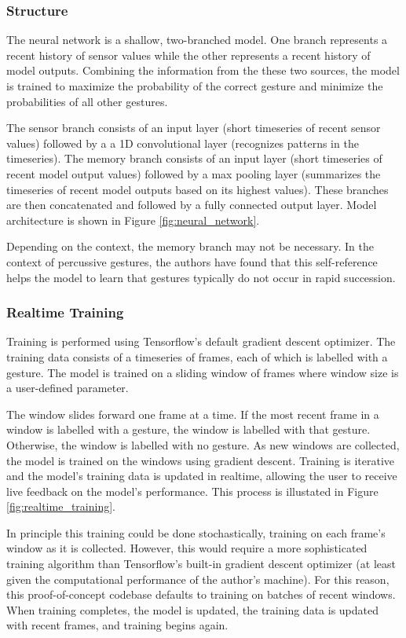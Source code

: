 \documentclass{nime-alternate} %
\begin{document}
\subsubsection{Structure}
The neural network is a shallow, two-branched model. One branch represents a recent history of sensor values while the other represents a recent history of model outputs. Combining the information from the these two sources, the model is trained to maximize the probability of the correct gesture and minimize the probabilities of all other gestures.

The sensor branch consists of an input layer (short timeseries of recent sensor values) followed by a  a 1D convolutional layer (recognizes patterns in the timeseries). The memory branch consists of an input layer (short timeseries of recent model output values) followed by a max pooling layer (summarizes the timeseries of recent model outputs based on its highest values). These branches are then concatenated and followed by a fully connected output layer. Model architecture is shown in Figure \ref{fig:neural_network}.

Depending on the context, the memory branch may not be necessary. In the context of percussive gestures, the authors have found that this self-reference helps the model to learn that gestures typically do not occur in rapid succession.


\subsubsection{Realtime Training}
Training is performed using Tensorflow's default gradient descent optimizer. The training data consists of a timeseries of frames, each of which is labelled with a gesture. The model is trained on a sliding window of frames where window size is a user-defined parameter.

The window slides forward one frame at a time. If the most recent frame in a window is labelled with a gesture, the window is labelled with that gesture. Otherwise, the window is labelled with no gesture. As new windows are collected, the model is trained on the windows using gradient descent. Training is iterative and the model's training data is updated in realtime, allowing the user to receive live feedback on the model's performance. This process is illustated in Figure \ref{fig:realtime_training}.

In principle this training could be done stochastically, training on each frame's window as it is collected. However, this would require a more sophisticated training algorithm than Tensorflow's built-in gradient descent optimizer (at least given the computational performance of the author's machine). For this reason, this proof-of-concept codebase defaults to training on batches of recent windows. When training completes, the model is updated, the training data is updated with recent frames, and training begins again.
\end{document}
